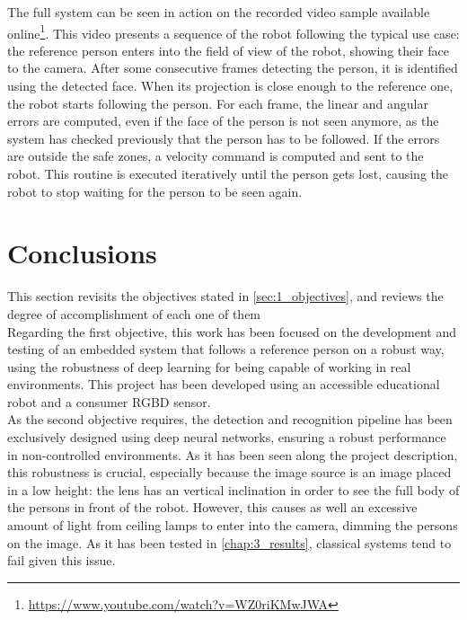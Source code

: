The full system can be seen in action on the recorded video sample available online\footnote{\url{https://www.youtube.com/watch?v=WZ0riKMwJWA}}. This video presents a sequence of the robot following the typical use case: the reference person enters into the field of view of the robot, showing their face to the camera. After some consecutive frames detecting the person, it is identified using the detected face. When its projection is close enough to the reference one, the robot starts following the person. For each frame, the linear and angular errors are computed, even if the face of the person is not seen anymore, as the system has checked previously that the person has to be followed. If the errors are outside the safe zones, a velocity command is computed and sent to the robot. This routine is executed iteratively until the person gets lost, causing the robot to stop waiting for the person to be seen again.



\section{Conclusions}

This section revisits the objectives stated in \autoref{sec:1_objectives}, and reviews the degree of accomplishment of each one of them\\

Regarding the first objective, this work has been focused on the development and testing of an embedded system that follows a reference person on a robust way, using the robustness of deep learning for being capable of working in real environments. This project has been developed using an accessible educational robot and a consumer RGBD sensor.\\

As the second objective requires, the detection and recognition pipeline has been exclusively designed using deep neural networks, ensuring a robust performance in non-controlled environments. As it has been seen along the project description, this robustness is crucial, especially because the image source is an image placed in a low height: the lens has an vertical inclination in order to see the full body of the persons in front of the robot. However, this causes as well an excessive amount of light from ceiling lamps to enter into the camera, dimming the persons on the image. As it has been tested in \autoref{chap:3_results}, classical systems tend to fail given this issue.\\


